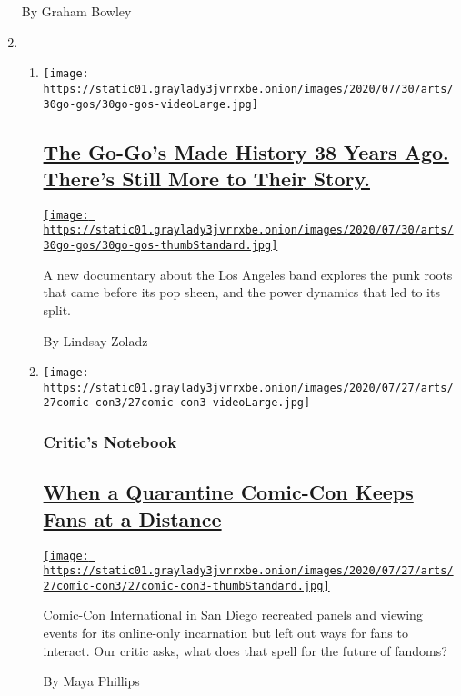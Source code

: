 \begin{enumerate}
  By Graham Bowley
\item
  \begin{enumerate}
  \def\labelenumii{\arabic{enumii}.}
  \item
    \texttt{[image: https://static01.graylady3jvrrxbe.onion/images/2020/07/30/arts/30go-gos/30go-gos-videoLarge.jpg]}

    \hypertarget{the-go-gos-made-history-38-years-ago-theres-still-more-to-their-story}{%
    \subsection{\texorpdfstring{\href{/2020/07/29/arts/music/the-go-gos-documentary.html}{The
    Go-Go's Made History 38 Years Ago. There's Still More to Their
    Story.}}{The Go-Go's Made History 38 Years Ago. There's Still More to Their Story.}}\label{the-go-gos-made-history-38-years-ago-theres-still-more-to-their-story}}

    \href{/2020/07/29/arts/music/the-go-gos-documentary.html}{\texttt{[image: https://static01.graylady3jvrrxbe.onion/images/2020/07/30/arts/30go-gos/30go-gos-thumbStandard.jpg]}}

    A new documentary about the Los Angeles band explores the punk roots
    that came before its pop sheen, and the power dynamics that led to
    its split.

    By Lindsay Zoladz
  \item
    \texttt{[image: https://static01.graylady3jvrrxbe.onion/images/2020/07/27/arts/27comic-con3/27comic-con3-videoLarge.jpg]}

    \hypertarget{critics-notebook}{%
    \subsubsection{Critic's Notebook}\label{critics-notebook}}

    \hypertarget{when-a-quarantine-comic-con-keeps-fans-at-a-distance}{%
    \subsection{\texorpdfstring{\href{/2020/07/29/arts/comic-con-fandom-quarantine.html}{When
    a Quarantine Comic-Con Keeps Fans at a
    Distance}}{When a Quarantine Comic-Con Keeps Fans at a Distance}}\label{when-a-quarantine-comic-con-keeps-fans-at-a-distance}}

    \href{/2020/07/29/arts/comic-con-fandom-quarantine.html}{\texttt{[image: https://static01.graylady3jvrrxbe.onion/images/2020/07/27/arts/27comic-con3/27comic-con3-thumbStandard.jpg]}}

    Comic-Con International in San Diego recreated panels and viewing
    events for its online-only incarnation but left out ways for fans to
    interact. Our critic asks, what does that spell for the future of
    fandoms?

    By Maya Phillips
  \end{enumerate}
\end{enumerate}

